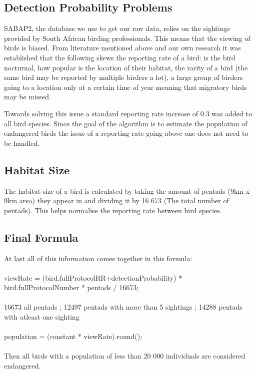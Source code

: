 \documentclass[a4paper]{article}
\begin{document}
\subsection{Detection Probability Problems}
SABAP2, the database we use to get our raw data, relies on the sightings provided by South African birding professionals. This means that the viewing of birds is biased. From literature mentioned above and our own research it was established that the following skews the reporting rate of a bird: is the bird nocturnal, how popular is the location of their habitat, the rarity of a bird (the same bird may be reported by multiple birders a lot), a large group of birders going to a location only at a certain time of year meaning that migratory birds may be missed.

Towards solving this issue a standard reporting rate increase of 0.3 was added to all bird species. Since the goal of the  algorithm is to estimate the population of endangered birds the issue of a reporting rate going above one does not need to be handled.

\subsection{Habitat Size}
The habitat size of a bird is calculated by taking the amount of pentads (9km x 9km area) they appear in and dividing it by 16 673 (The total number of pentads). This helps normalise the reporting rate between bird species.

\subsection{Final Formula}
At last all of this information comes together in this formula: \\ \\ viewRate = 
(bird.fullProtocolRR+detectionProbability) * bird.fullProtocolNumber * pentads /
        16673; \\ \\ 16673 all pentads ; 12497 pentads with more than 5 sightings ; 14288 pentads with atleast one sighting
        \\ \\population = (constant * viewRate).round();\\ \\
        Then all birds with a population of less than 20 000 individuals are considered endangered.
\end{document}
